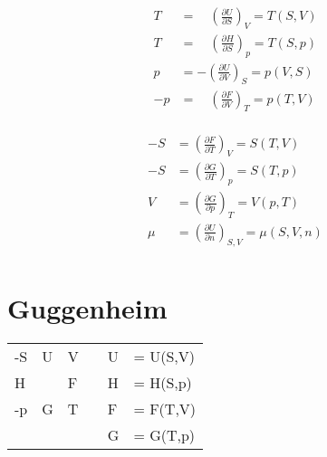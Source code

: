 \documentclass[twocolumn]{article}
\begin{document}
\begin{multicols}{2}

\begin{align*}
	T   	&= \quad \left(\frac{\partial U}{\partial S}\right)_{V} = T(S,V)  	\\
	T   	&= \quad \left(\frac{\partial H}{\partial S}\right)_{p} = T(S,p)  	\\
	p   	&= -\left(\frac{\partial U}{\partial V}\right)_{S} = p(V,S)	      	\\
	-p  	&= \quad \left(\frac{\partial F}{\partial V}\right)_{T} = p(T,V)	\\
\end{align*}

\begin{align*}
	-S 	&= \left(\frac{\partial F}{\partial T}\right)_{V} = S(T,V)		\\
	-S 	&= \left(\frac{\partial G}{\partial T}\right)_{p} = S(T,p)		\\
	 V 	&= \left(\frac{\partial G}{\partial p}\right)_{T} = V(p,T)		\\
	\mu 	&= \left(\frac{\partial U}{\partial n}\right)_{S,V} = \mu(S,V,n)	\\
\end{align*}
\end{multicols}


\section{Guggenheim}
\Large
\begin{tabular}{llllll}
	-S & U & V &	&U &= U(S,V) \\ 
	 H &   & F &   	&H &= H(S,p) \\
	-p & G & T &   	&F &= F(T,V) \\
	   &   &   &  	&G &= G(T,p) \\
\end{tabular}
\normalsize
\bigskip
\bigskip
\bigskip
\pagebreak


\end{document}
